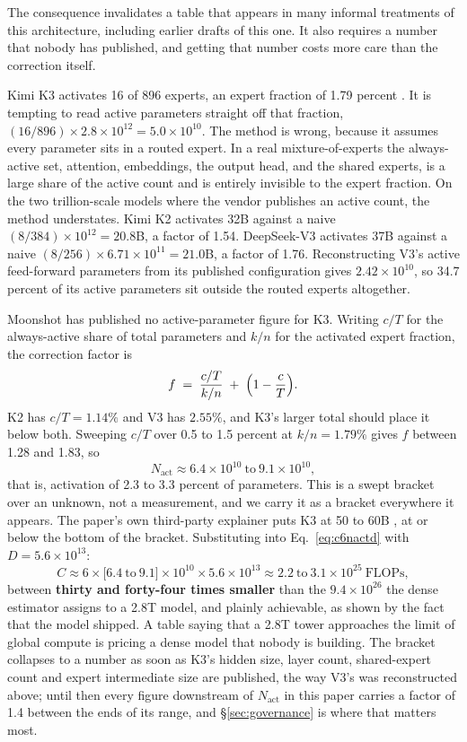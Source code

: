 \documentclass[11pt]{article}
\begin{document}
The consequence invalidates a table that appears in many informal treatments of this architecture, including earlier drafts of this one. It also requires a number that nobody has published, and getting that number costs more care than the correction itself.

Kimi K3 activates 16 of 896 experts, an expert fraction of 1.79 percent \cite{moonshot2026k3}. It is tempting to read active parameters straight off that fraction, $(16/896)\times2.8\times10^{12} = 5.0\times10^{10}$. The method is wrong, because it assumes every parameter sits in a routed expert. In a real mixture-of-experts the always-active set, attention, embeddings, the output head, and the shared experts, is a large share of the active count and is entirely invisible to the expert fraction. On the two trillion-scale models where the vendor publishes an active count, the method understates. Kimi K2 activates 32B against a naive $(8/384)\times10^{12} = 20.8$B, a factor of 1.54. DeepSeek-V3 activates 37B against a naive $(8/256)\times6.71\times10^{11} = 21.0$B, a factor of 1.76. Reconstructing V3's active feed-forward parameters from its published configuration gives $2.42\times10^{10}$, so 34.7 percent of its active parameters sit outside the routed experts altogether.

Moonshot has published no active-parameter figure for K3. Writing $c/T$ for the always-active share of total parameters and $k/n$ for the activated expert fraction, the correction factor is
\begin{equation}
f \;=\; \frac{c/T}{k/n} \;+\; \Bigl(1 - \frac{c}{T}\Bigr).
\label{eq:actcorrection}
\end{equation}
K2 has $c/T = 1.14\%$ and V3 has $2.55\%$, and K3's larger total should place it below both. Sweeping $c/T$ over 0.5 to 1.5 percent at $k/n = 1.79\%$ gives $f$ between 1.28 and 1.83, so
\[
N_{\mathrm{act}} \approx 6.4\times10^{10}\ \text{to}\ 9.1\times10^{10},
\]
that is, activation of 2.3 to 3.3 percent of parameters. This is a swept bracket over an unknown, not a measurement, and we carry it as a bracket everywhere it appears. The paper's own third-party explainer puts K3 at 50 to 60B \cite{huang2026k3}, at or below the bottom of the bracket. Substituting into Eq.~\eqref{eq:c6nactd} with $D = 5.6\times10^{13}$:
\[
C \approx 6 \times \bigl[6.4\ \text{to}\ 9.1\bigr]\times10^{10} \times 5.6\times10^{13} \approx 2.2\ \text{to}\ 3.1\times10^{25}\ \text{FLOPs},
\]
between \textbf{thirty and forty-four times smaller} than the $9.4\times10^{26}$ the dense estimator assigns to a 2.8T model, and plainly achievable, as shown by the fact that the model shipped. A table saying that a 2.8T tower approaches the limit of global compute is pricing a dense model that nobody is building. The bracket collapses to a number as soon as K3's hidden size, layer count, shared-expert count and expert intermediate size are published, the way V3's was reconstructed above; until then every figure downstream of $N_{\mathrm{act}}$ in this paper carries a factor of 1.4 between the ends of its range, and \S\ref{sec:governance} is where that matters most.
\end{document}
